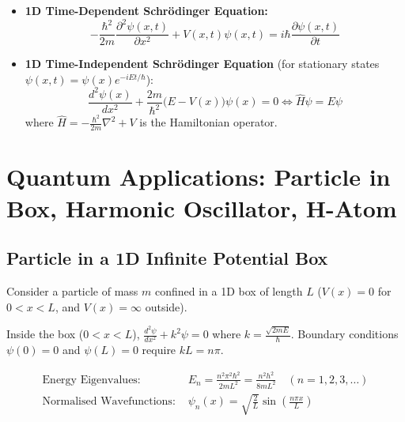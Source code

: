\documentclass[12pt,a4paper]{article}
\begin{document}
\begin{tcolorbox}[formulabox, title={\textbf{Schrödinger Wave Equations}}]
\begin{itemize}[leftmargin=*, itemsep=4pt]
  \item \textbf{1D Time-Dependent Schrödinger Equation:}
  \begin{equation}
  -\frac{\hbar^2}{2m} \frac{\partial^2 \psi(x,t)}{\partial x^2} + V(x,t)\psi(x,t) = i\hbar \frac{\partial \psi(x,t)}{\partial t}
  \end{equation}
  \item \textbf{1D Time-Independent Schrödinger Equation} (for stationary states $\psi(x,t) = \psi(x) e^{-i E t / \hbar}$):
  \begin{equation}
  \frac{d^2 \psi(x)}{dx^2} + \frac{2m}{\hbar^2}\big(E - V(x)\big)\psi(x) = 0 \iff \hat{H}\psi = E\psi
  \end{equation}
  where $\hat{H} = -\frac{\hbar^2}{2m}\nabla^2 + V$ is the Hamiltonian operator.
\end{itemize}
\end{tcolorbox}

\section{Quantum Applications: Particle in Box, Harmonic Oscillator, H-Atom}

\subsection{Particle in a 1D Infinite Potential Box}

Consider a particle of mass $m$ confined in a 1D box of length $L$ ($V(x) = 0$ for $0 < x < L$, and $V(x) = \infty$ outside).

Inside the box ($0 < x < L$), $\frac{d^2\psi}{dx^2} + k^2 \psi = 0$ where $k = \frac{\sqrt{2mE}}{\hbar}$.
Boundary conditions $\psi(0) = 0$ and $\psi(L) = 0$ require $k L = n \pi$.

\begin{tcolorbox}[formulabox, title={\textbf{1D Box Eigenvalues and Normalised Eigenfunctions}}]
\begin{align}
\text{Energy Eigenvalues: } & E_n = \frac{n^2 \pi^2 \hbar^2}{2 m L^2} = \frac{n^2 h^2}{8 m L^2} \quad (n = 1, 2, 3, \ldots) \\[4pt]
\text{Normalised Wavefunctions: } & \psi_n(x) = \sqrt{\frac{2}{L}} \sin\left(\frac{n \pi x}{L}\right)
\end{align}
\end{tcolorbox}
\end{document}

